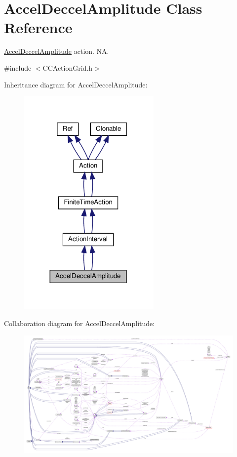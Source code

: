 \hypertarget{classAccelDeccelAmplitude}{}\section{Accel\+Deccel\+Amplitude Class Reference}
\label{classAccelDeccelAmplitude}


\hyperlink{classAccelDeccelAmplitude}{Accel\+Deccel\+Amplitude} action.  NA.  




{\ttfamily \#include $<$C\+C\+Action\+Grid.\+h$>$}



Inheritance diagram for Accel\+Deccel\+Amplitude\+:
\nopagebreak
\begin{figure}[H]
\begin{center}
\leavevmode
\includegraphics[width=197pt]{classAccelDeccelAmplitude__inherit__graph}
\end{center}
\end{figure}


Collaboration diagram for Accel\+Deccel\+Amplitude\+:
\nopagebreak
\begin{figure}[H]
\begin{center}
\leavevmode
\includegraphics[width=350pt]{classAccelDeccelAmplitude__coll__graph}
\end{center}
\end{figure}
